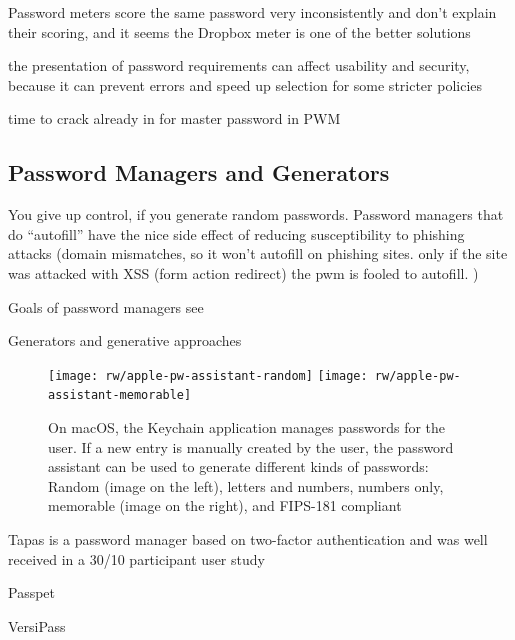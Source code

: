 	Password meters score the same password very inconsistently and don't explain their scoring, and it seems the Dropbox meter is one of the better solutions \cite{Carnavalet2014AnalyzingPWStrengthMeters}
	
	the presentation of password requirements can affect usability and security, because it can prevent errors and speed up selection for some stricter policies \cite{Shay2015SpoonfulOfSugar}
	
	time to crack already in \cite{Yee2006Passpet} for master password in PWM
	
	
	\subsection{Password Managers and Generators}\label{sec:rw:pwm_generators}
	
	You give up control, if you generate random passwords. 
	Password managers that do ``autofill'' have the nice side effect of reducing susceptibility to phishing attacks (domain mismatches, so it won't autofill on phishing sites. only if the site was attacked with XSS (form action redirect) the pwm is fooled to autofill. )
	
	Goals of password managers see \cite{Yee2006Passpet}
	
	Generators and generative approaches
	\begin{figure}
		\centering
		\texttt{[image: rw/apple-pw-assistant-random]}
		\texttt{[image: rw/apple-pw-assistant-memorable]}
		\caption{\label{fig:rw:pw_generators} On macOS, the Keychain application manages passwords for the user. If a new entry is manually created by the user, the password assistant can be used to generate different kinds of passwords: Random (image on the left), letters and numbers, numbers only, memorable (image on the right), and FIPS-181 compliant}
	\end{figure}
	
	
	
	Tapas is a password manager based on two-factor authentication and was well received in a 30/10 participant user study \cite{McCarney2012Tapas, McCarney2013PWMThesis}
	
	Passpet \cite{Yee2006Passpet}
	
	VersiPass \cite{Stobert2014PWMThatDoesntRemember}
	
